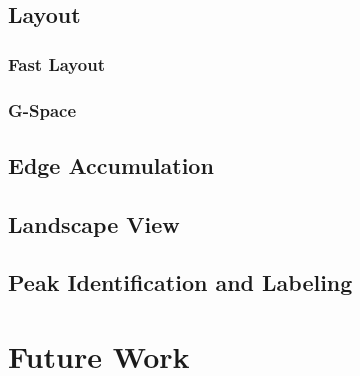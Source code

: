 \documentclass[pdf,12pt,report,strict]{SANDreport}
\begin{document}
\section{Layout}
\label{sec:Layout}

\subsection{Fast Layout}
\label{sec:Layout:FastLayout}

\subsection{G-Space}
\label{sec:Layout:GSpace}

\section{Edge Accumulation}
\label{sec:EdgeAccumulation}

\section{Landscape View}
\label{sec:LandscapeView}

\section{Peak Identification and Labeling}
\label{sec:PeakIdentificationAndLabeling}


\chapter{Future Work}
\label{chap:FutureWork}





\end{document}
